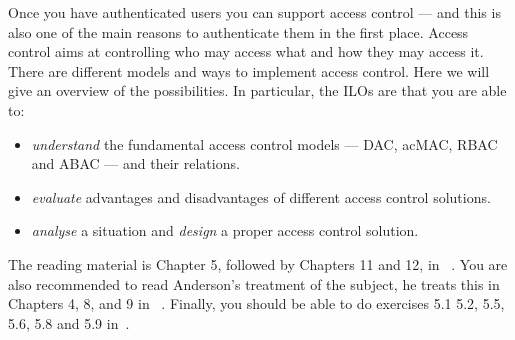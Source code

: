 Once you have authenticated users you can support access control --- and this 
is also one of the main reasons to authenticate them in the first place.
Access control aims at controlling who may access what and how they may access 
it.
There are different models and ways to implement access control.
Here we will give an overview of the possibilities.
In particular, the \acp{ILO} are that you are able to:
\begin{itemize}
  \item \emph{understand} the fundamental access control models --- \ac{DAC}, 
    \ac{acMAC}, \ac{RBAC} and \ac{ABAC} --- and their relations.
  \item \emph{evaluate} advantages and disadvantages of different access 
    control solutions.
  \item \emph{analyse} a situation and \emph{design} a proper access control 
    solution.
\end{itemize}

The reading material is Chapter 5, followed by Chapters 11 and 12, in 
~\cite{Gollmann2011cs}.
You are also recommended to read Anderson's treatment of the subject, he treats 
this in Chapters 4, 8, and 9 in 
~\cite{Anderson2008sea}.
Finally, you should be able to do exercises 5.1 5.2, 5.5, 5.6, 5.8 and 5.9 
in~\cite{Gollmann2011cs}.
